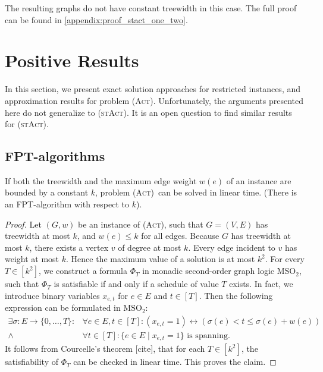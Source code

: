 \documentclass[runningheads]{llncs}
\numberwithin{equation}{section}
\newcommand{\set}[1]{\{ #1 \}}
\newcommand{\fromto}[2]{\set{#1, \ldots, #2}}
\newcommand{\act}{\textsc{(Act)}}
\newcommand{\stact}{\textsc{(stAct)}}
\begin{document}
The resulting graphs do not have constant treewidth in this case. The full proof can be found in \cref{appendix:proof_stact_one_two}. 


\section{Positive Results}
\label{sec:positive_results}

In this section, we present exact solution approaches for restricted instances, and approximation results for problem \act. Unfortunately, the arguments presented here do not generalize to \stact. It is an open question to find similar results for \stact. 

\subsection{FPT-algorithms}

\begin{theorem}
If both the treewidth and the maximum edge weight $w(e)$ of an instance are bounded by  a constant $k$, problem \act\ can be solved in linear time. (There is an FPT-algorithm with respect to $k$). 
\end{theorem}
\begin{proof}
Let $(G, w)$ be an instance of \act, such that $G = (V, E)$ has treewidth at most $k$, and $w(e) \leq k$ for all edges. Because $G$ has treewidth at most $k$, there exists a vertex $v$ of degree at most $k$. Every edge incident to $v$ has weight at most $k$. Hence the maximum value of a solution is at most $k^2$. For every $T \in [k^2]$, we construct a formula $\Phi_T$ in monadic second-order graph logic $\text{MSO}_2$, such that $\Phi_T$ is satisfiable if and only if a schedule of value $T$ exists. In fact, we introduce binary variables $x_{e,t}$ for $e \in E$ and $t \in [T]$. Then the following expression can be formulated in $\text{MSO}_2$:
\begin{align*}
\exists \sigma :  E \rightarrow \fromto{0}{T} : &\forall e \in E, t \in [T]: (x_{e,t}=1) \leftrightarrow \left(\sigma(e) < t \leq \sigma(e) + w(e)\right)\\
\land &\forall t \in [T]: \set{e \in E \mid x_{e,t} = 1} \text{ is spanning.}
\end{align*}
It follows from Courcelle's theorem [cite], that for each $T \in [k^2]$, the satisfiability of $\Phi_T$ can be checked in linear time. This proves the claim.
\end{proof}
\end{document}
